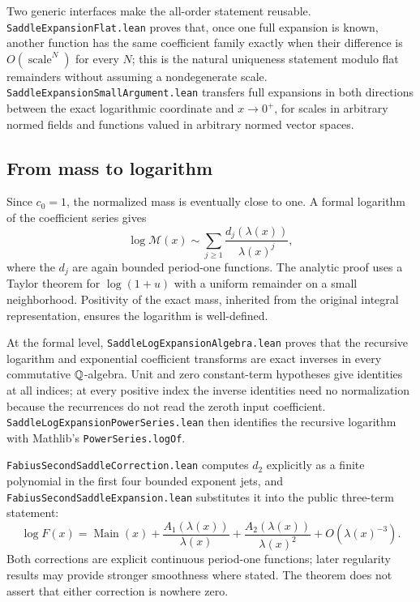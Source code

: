 \documentclass[11pt,oneside]{article}
\theoremstyle{definition}
\theoremstyle{remark}
\begin{document}
Two generic interfaces make the all-order statement reusable.
\nolinkurl{SaddleExpansionFlat.lean} proves that, once one full expansion is
known, another function has the same coefficient family exactly when their
difference is \(O(\operatorname{scale}^N)\) for every \(N\); this is the
natural uniqueness statement modulo flat remainders without assuming a
nondegenerate scale.  \nolinkurl{SaddleExpansionSmallArgument.lean} transfers
full expansions in both directions between the exact logarithmic coordinate
and \(x\to0^+\), for scales in arbitrary normed fields and functions valued
in arbitrary normed vector spaces.

\subsection{From mass to logarithm}
Since \(c_0=1\), the normalized mass is eventually close to one.  A formal logarithm of the coefficient series gives
\[
  \log\mathcal M(x)
  \sim\sum_{j\geq1}\frac{d_j(\lambda(x))}{\lambda(x)^j},
\]
where the \(d_j\) are again bounded period-one functions.  The analytic proof uses a Taylor theorem for \(\log(1+u)\) with a uniform remainder on a small neighborhood.  Positivity of the exact mass, inherited from the original integral representation, ensures the logarithm is well-defined.

At the formal level, \nolinkurl{SaddleLogExpansionAlgebra.lean} proves that
the recursive logarithm and exponential coefficient transforms are exact
inverses in every commutative \(\mathbb{Q}\)-algebra.  Unit and zero constant-term
hypotheses give identities at all indices; at every positive index the
inverse identities need no normalization because the recurrences do not read
the zeroth input coefficient.  \nolinkurl{SaddleLogExpansionPowerSeries.lean}
then identifies the recursive logarithm with Mathlib's
\nolinkurl{PowerSeries.logOf}.

\nolinkurl{FabiusSecondSaddleCorrection.lean} computes \(d_2\) explicitly as a
finite polynomial in the first four bounded exponent jets, and
\nolinkurl{FabiusSecondSaddleExpansion.lean} substitutes it into the public
three-term statement:
\[
  \log F(x)=\operatorname{Main}(x)
   +\frac{A_1(\lambda(x))}{\lambda(x)}
   +\frac{A_2(\lambda(x))}{\lambda(x)^2}
   +O\!\left(\lambda(x)^{-3}\right).
\]
Both corrections are explicit continuous period-one functions; later
regularity results may provide stronger smoothness where stated.  The theorem
does not assert that either correction is nowhere zero.
\end{document}
